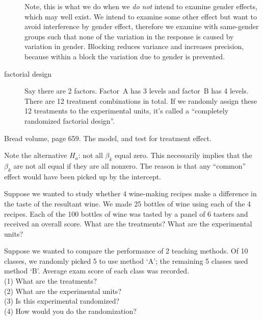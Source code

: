 \documentclass[12pt]{article}
\begin{document}
\begin{description}
Note, this is what we do when we \emph{do not} intend to examine gender
effects, which may well exist. We intend to examine some other effect
but want to avoid interference by gender effect,
therefore we examine with same-gender groups such that none of
the variation in the response is caused by variation in gender.
Blocking reduces variance and increases precision,
because within a block the variation due to gender is prevented.

\item[factorial design]
Say there are 2 factors. Factor~A has 3 levels and factor~B has 4
levels. There are 12 treatment combinations in total.
If we randomly assign these 12 treatments to the experimental units,
it's called a ``completely randomized factorial design''.

\end{description}

\example Bread volume, page 659. The model, and test for treatment
effect.

Note the alternative $H_a$: not all $\beta_k$ equal zero.
This necessarily implies that the $\beta_k$ are not all equal
if they are all nonzero.
The reason is that any ``common'' effect would have been picked up by
the intercept.

\example
Suppose we wanted to study whether 4 wine-making recipes
make a difference in the taste of the resultant wine.
We made 25 bottles of wine using each of the 4 recipes.
Each of the 100 bottles of wine was tasted by a panel of 6 tasters
and received an overall score.
What are the treatments? What are the experimental units?

\example
Suppose we wanted to compare the performance of 2 teaching methods.
Of 10 classes, we randomly picked 5 to use method `A';
the remaining 5 classes used method `B'.
Average exam score of each class was recorded.\\
(1) What are the treatments?\\
(2) What are the experimental units?\\
(3) Is this experimental randomized?\\
(4) How would you do the randomization?
\end{document}
